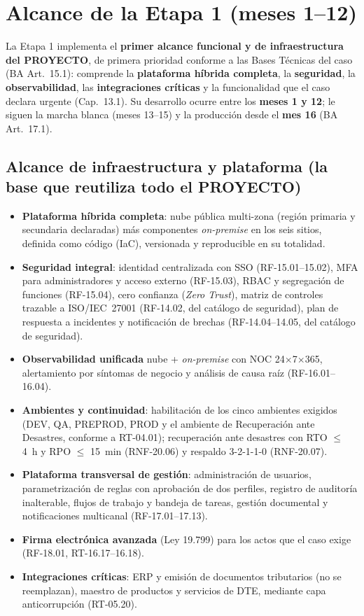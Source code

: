 \section{Alcance de la Etapa 1 (meses 1--12)}

La Etapa 1 implementa el \textbf{primer alcance funcional y de infraestructura del PROYECTO}, de primera prioridad conforme a las Bases Técnicas del caso (BA Art.\ 15.1): comprende la \textbf{plataforma híbrida completa}, la \textbf{seguridad}, la \textbf{observabilidad}, las \textbf{integraciones críticas} y la funcionalidad que el caso declara urgente (Cap.\ 13.1). Su desarrollo ocurre entre los \textbf{meses 1 y 12}; le siguen la marcha blanca (meses 13--15) y la producción desde el \textbf{mes 16} (BA Art.\ 17.1).

\subsection{Alcance de infraestructura y plataforma (la base que reutiliza todo el PROYECTO)}

\begin{itemize}
  \item \textbf{Plataforma híbrida completa}: nube pública multi-zona (región primaria y secundaria declaradas) más componentes \emph{on-premise} en los seis sitios, definida como código (IaC), versionada y reproducible en su totalidad.
  \item \textbf{Seguridad integral}: identidad centralizada con SSO (RF-15.01--15.02), MFA para administradores y acceso externo (RF-15.03), RBAC y segregación de funciones (RF-15.04), cero confianza (\emph{Zero Trust}), matriz de controles trazable a ISO/IEC~27001 (RF-14.02, del catálogo de seguridad), plan de respuesta a incidentes y notificación de brechas (RF-14.04--14.05, del catálogo de seguridad).
  \item \textbf{Observabilidad unificada} nube + \emph{on-premise} con NOC 24$\times$7$\times$365, alertamiento por síntomas de negocio y análisis de causa raíz (RF-16.01--16.04).
  \item \textbf{Ambientes y continuidad}: habilitación de los cinco ambientes exigidos (DEV, QA, PREPROD, PROD y el ambiente de Recuperación ante Desastres, conforme a RT-04.01); recuperación ante desastres con RTO $\leq$ 4~h y RPO $\leq$ 15~min (RNF-20.06) y respaldo 3-2-1-1-0 (RNF-20.07).
  \item \textbf{Plataforma transversal de gestión}: administración de usuarios, parametrización de reglas con aprobación de dos perfiles, registro de auditoría inalterable, flujos de trabajo y bandeja de tareas, gestión documental y notificaciones multicanal (RF-17.01--17.13).
  \item \textbf{Firma electrónica avanzada} (Ley 19.799) para los actos que el caso exige (RF-18.01, RT-16.17--16.18).
  \item \textbf{Integraciones críticas}: ERP y emisión de documentos tributarios (no se reemplazan), maestro de productos y servicios de DTE, mediante capa anticorrupción (RT-05.20).
\end{itemize}

